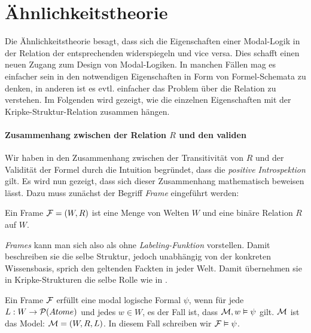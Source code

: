 \section{Ähnlichkeitstheorie} %
\label{sub:Aehnlichkeitstheorie}

Die Ähnlichkeitstheorie besagt, dass sich die Eigenschaften einer Modal-Logik in der Relation der entsprechenden \KS widerspiegeln und vice versa. 
Dies schafft einen neuen Zugang zum Design von Modal-Logiken. 
In manchen Fällen mag es einfacher sein in den notwendigen Eigenschaften in Form von Formel-Schemata zu denken, in anderen ist es evtl. einfacher das Problem über die Relation zu verstehen. 
Im Folgenden wird gezeigt, wie die einzelnen Eigenschaften mit der Kripke-Struktur-Relation zusammen hängen.


\paragraph{Zusammenhang zwischen der Relation $R$ und den validen \formelSchemata}

Wir haben in  den Zusammenhang zwischen der Transitivität von $R$ und der Validität der Formel \vierFormel durch die Intuition begründet, dass die \emph{positive Introspektion} gilt.
Es wird nun gezeigt, dass sich dieser Zusammenhang mathematisch beweisen lässt.
Dazu muss zunächst der Begriff \emph{Frame} eingeführt werden:

\begin{definition}
	\label{def:frame}
	Ein Frame $\mathcal{F} = (W,R)$ ist eine Menge von Welten $W$ und eine binäre Relation $R$ auf $W$.
	\cite[S.322]{huth2004logic}
\end{definition}

\emph{Frames} kann man sich also als \KS ohne \emph{Labeling-Funktion} vorstellen.
Damit beschreiben sie die selbe Struktur, jedoch unabhängig von der konkreten Wissensbasis, sprich den geltenden Fackten in jeder Welt.
Damit übernehmen sie in Kripke-Strukturen die selbe Rolle wie \formelSchemata in \MLFn .

\begin{definition}
	\label{def:frame_erfuellt}
	Ein Frame $\mathcal{F}$ erfüllt eine modal logische Formal $\psi$, wenn für jede  $L: W \rightarrow \mathcal{P}(Atome)$ und jedes $w \in W$, es der Fall ist, dass $\mathcal{M},w \vDash \psi$ gilt. $\mathcal{M}$ ist das Model: $\mathcal{M} = (W,R,L)$.
	In diesem Fall schreiben wir $\mathcal{F} \vDash \psi$.
	\cite[S.322f]{huth2004logic}
\end{definition}


